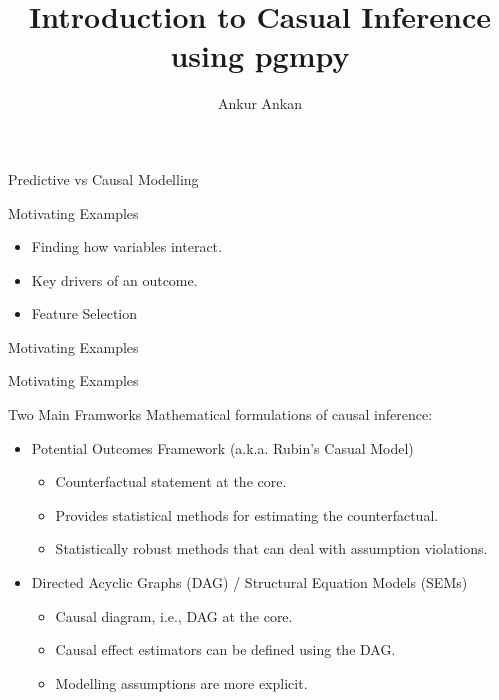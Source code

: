\documentclass{beamer}
\begin{document}
\title[Causal Inference using pgmpy]{Introduction to Casual Inference using pgmpy}
\author{Ankur Ankan}
\date{}

\maketitle

\begin{frame}{Predictive vs Causal Modelling}
\end{frame}

\begin{frame}{Motivating Examples}
	\begin{itemize}
		\item Finding how variables interact.
		\item Key drivers of an outcome.
		\item Feature Selection
	\end{itemize}
\end{frame}

\begin{frame}{Motivating Examples}
\end{frame}

\begin{frame}{Motivating Examples}
\end{frame}

\begin{frame}{Two Main Framworks}
	Mathematical formulations of causal inference:
	\begin{itemize}
		\item Potential Outcomes Framework (a.k.a. Rubin's Casual Model)
			\begin{itemize}
				\item Counterfactual statement at the core.
				\item Provides statistical methods for estimating the counterfactual.
				\item Statistically robust methods that can deal with assumption violations.
			\end{itemize}
		\item Directed Acyclic Graphs (DAG) / Structural Equation Models (SEMs)
			\begin{itemize}
				\item Causal diagram, i.e., DAG at the core.
				\item Causal effect estimators can be defined using the DAG.
				\item Modelling assumptions are more explicit.
			\end{itemize}
	\end{itemize}
\end{frame}
\end{document}

